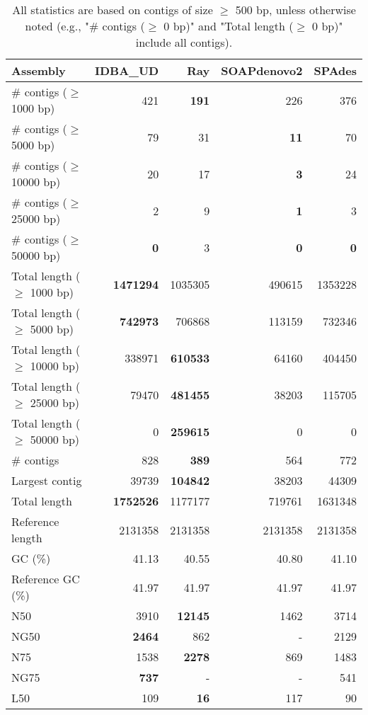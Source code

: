 \documentclass[12pt,a4paper]{article}
\begin{document}
\begin{table}[ht]
\begin{center}
\caption{All statistics are based on contigs of size $\geq$ 500 bp, unless otherwise noted (e.g., "\# contigs ($\geq$ 0 bp)" and "Total length ($\geq$ 0 bp)" include all contigs).}
\begin{tabular}{|l*{4}{|r}|}
\hline
Assembly & IDBA\_UD & Ray & SOAPdenovo2 & SPAdes \\ \hline
\# contigs ($\geq$ 1000 bp) & 421 & {\bf 191} & 226 & 376 \\ \hline
\# contigs ($\geq$ 5000 bp) & 79 & 31 & {\bf 11} & 70 \\ \hline
\# contigs ($\geq$ 10000 bp) & 20 & 17 & {\bf 3} & 24 \\ \hline
\# contigs ($\geq$ 25000 bp) & 2 & 9 & {\bf 1} & 3 \\ \hline
\# contigs ($\geq$ 50000 bp) & {\bf 0} & 3 & {\bf 0} & {\bf 0} \\ \hline
Total length ($\geq$ 1000 bp) & {\bf 1471294} & 1035305 & 490615 & 1353228 \\ \hline
Total length ($\geq$ 5000 bp) & {\bf 742973} & 706868 & 113159 & 732346 \\ \hline
Total length ($\geq$ 10000 bp) & 338971 & {\bf 610533} & 64160 & 404450 \\ \hline
Total length ($\geq$ 25000 bp) & 79470 & {\bf 481455} & 38203 & 115705 \\ \hline
Total length ($\geq$ 50000 bp) & 0 & {\bf 259615} & 0 & 0 \\ \hline
\# contigs & 828 & {\bf 389} & 564 & 772 \\ \hline
Largest contig & 39739 & {\bf 104842} & 38203 & 44309 \\ \hline
Total length & {\bf 1752526} & 1177177 & 719761 & 1631348 \\ \hline
Reference length & 2131358 & 2131358 & 2131358 & 2131358 \\ \hline
GC (\%) & 41.13 & 40.55 & 40.80 & 41.10 \\ \hline
Reference GC (\%) & 41.97 & 41.97 & 41.97 & 41.97 \\ \hline
N50 & 3910 & {\bf 12145} & 1462 & 3714 \\ \hline
NG50 & {\bf 2464} & 862 & - & 2129 \\ \hline
N75 & 1538 & {\bf 2278} & 869 & 1483 \\ \hline
NG75 & {\bf 737} & - & - & 541 \\ \hline
L50 & 109 & {\bf 16} & 117 & 90 \\ \hline

\end{tabular}
\end{center}
\end{table}
\end{document}
